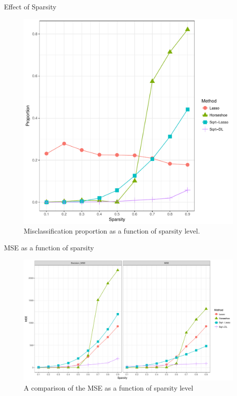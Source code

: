 \documentclass[10pt]{beamer}
\theoremstyle{plain}
\begin{document}
\begin{frame}{Effect of Sparsity}
	\begin{figure}
\centering
\includegraphics[height = .85\textheight , width = \linewidth]{Sparsity_MSP_n=p}
\caption{Misclassification proportion as a function of sparsity level.}
\label{fig:msp}
\end{figure}
\end{frame}

\begin{frame}{MSE as a function of sparsity}
	\begin{figure}[h!]
  \centering
  \includegraphics[width=\linewidth , height = .85\textheight ]{Sparsity_MSE_high_n=p}\caption{A comparison of the MSE as a function of sparsity level}
\label{fig:test}
\end{figure}
\end{frame}
\end{document}
